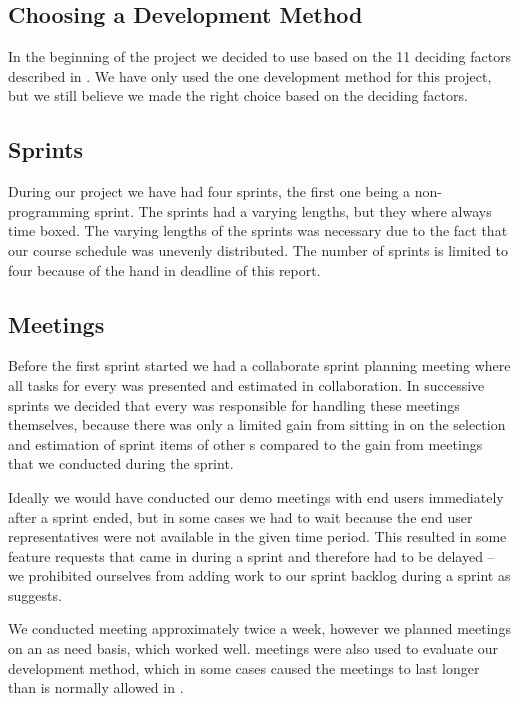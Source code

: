 \subsection{Choosing a Development Method}
In the beginning of the project we decided to use \sos{} based on the 11 deciding factors described in .
We have only used the one development method for this project, but we still believe we made the right choice based on the deciding factors.



\subsection{Sprints}
During our project we have had four sprints, the first one being a non-programming sprint.
The sprints had a varying lengths, but they where always time boxed. 
The varying lengths of the sprints was necessary due to the fact that our course schedule was unevenly distributed. 
The number of sprints is limited to four because of the hand in deadline of this report.




\subsection{Meetings}
Before the first sprint started we had a collaborate sprint planning meeting where all tasks for every \subgroup{} was presented and estimated in collaboration.
In successive sprints we decided that every \subgroup{} was responsible for handling these meetings themselves, because there was only a limited gain from sitting in on the selection and estimation of sprint items of other \subgroup{}s  compared to the gain from \sos{} meetings that we conducted during the sprint.

Ideally we would have conducted our demo meetings with end users immediately after a sprint ended, but in some cases we had to wait because the end user representatives were not available in the given time period.
This resulted in some feature requests that came in during a sprint and therefore had to be delayed -- we prohibited ourselves from adding work to our sprint backlog during a sprint as \scrum{} suggests.

We conducted \sos{} meeting approximately twice a week, however we planned meetings on an as need basis, which worked well.
\sos{} meetings were also used to evaluate our development method, which in some cases caused the meetings to last longer than is normally allowed in \sos{}.

